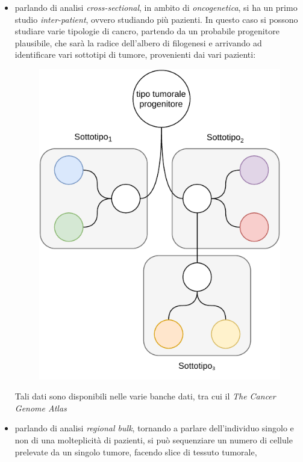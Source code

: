 \documentclass[a4paper,12pt, oneside]{book}
\begin{document}
\begin{itemize}
  \item parlando di analisi \textit{cross-sectional}, in ambito di
  \textit{oncogenetica}, si ha un primo studio \textit{inter-patient}, ovvero
  studiando più pazienti. In questo caso si possono studiare varie tipologie di
  cancro, partendo da un probabile progenitore plausibile, che sarà la radice
  dell'albero di filogenesi e arrivando ad identificare vari sottotipi di
  tumore, provenienti dai vari pazienti:
  \begin{figure}[H]
    \centering
    \includegraphics[scale = 0.7]{img/filo1.pdf}
  \end{figure}
  Tali dati sono disponibili nelle varie banche dati, tra cui il \textit{The
    Cancer Genome Atlas} 
  \item parlando di analisi \textit{regional bulk}, tornando a parlare
  dell'individuo singolo e non di una molteplicità di pazienti, si può
  sequenziare un numero 
  di cellule prelevate da un singolo tumore, facendo slice di tessuto tumorale,

\end{itemize}
\end{document}
